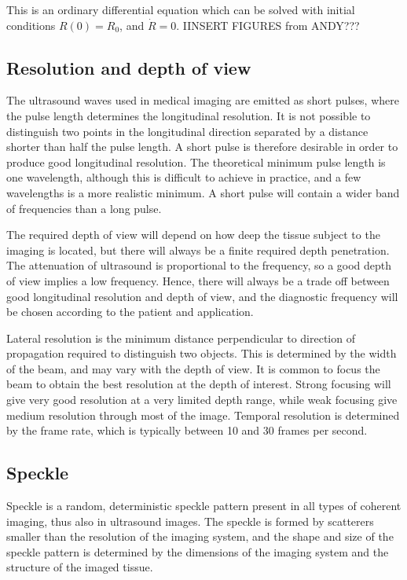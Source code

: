 This is an ordinary differential equation which can be solved with initial conditions $R(0) = R_0$, and $\dot{R} = 0$\cite{Moss2014}. IINSERT FIGURES from ANDY???
   
\subsection{Resolution and depth of view}
The ultrasound waves used in medical imaging are emitted as short pulses, where the pulse length determines the longitudinal resolution. It is not possible to distinguish two points in the longitudinal direction separated by a distance shorter than half the pulse length. A short pulse is therefore desirable in order to produce good longitudinal resolution. The theoretical minimum pulse length is one wavelength, although this is difficult to achieve in practice, and a few wavelengths is a more realistic minimum. A short pulse will contain a wider band of frequencies than a long pulse. 

The required depth of view will depend on how deep the tissue subject to the imaging is located, but there will always be a finite required depth penetration. The attenuation of ultrasound is proportional to the frequency, so a good depth of view implies a low frequency. Hence, there will always be a trade off between good longitudinal resolution and depth of view, and the diagnostic frequency will be chosen according to the patient and application. 

Lateral resolution is the minimum distance perpendicular to direction of propagation required to distinguish two objects. This is determined by the width of the beam, and may vary with the depth of view. It is common to focus the beam to obtain the best resolution at the depth of interest. Strong focusing will give very good resolution at a very limited depth range, while weak focusing give medium resolution through most of the image. Temporal resolution is determined by the frame rate, which is typically between 10 and 30 frames per second. 

\subsection{Speckle}
Speckle is a random, deterministic speckle pattern present in all types of coherent imaging, thus also in ultrasound images. The speckle is formed by scatterers smaller than the resolution of the imaging system, and the shape and size of the speckle pattern is determined by the dimensions of the imaging system and the structure of the imaged tissue.


